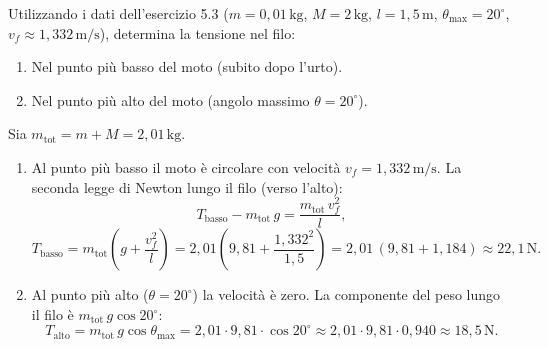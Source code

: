 \begin{question}[ID=5.4, subtitle={Tensione nel filo del pendolo balistico}, tags={pendolo balistico, tensione del filo}, difficulty=difficile]
Utilizzando i dati dell'esercizio 5.3 (\(m = 0{,}01 \, \text{kg}\), \(M = 2 \, \text{kg}\), \(l = 1{,}5 \, \text{m}\), \(\theta_{\max} = 20^\circ\), \(v_f \approx 1{,}332 \, \text{m/s}\)), determina la tensione nel filo:
\begin{enumerate}
    \item Nel punto più basso del moto (subito dopo l'urto).
    \item Nel punto più alto del moto (angolo massimo \(\theta = 20^\circ\)).
\end{enumerate}
\begin{solution}
    Sia \(m_{\text{tot}} = m + M = 2{,}01 \, \text{kg}\).
    \begin{enumerate}
        \item Al punto più basso il moto è circolare con velocità \(v_f = 1{,}332 \, \text{m/s}\).
        La seconda legge di Newton lungo il filo (verso l'alto):
        \[
            T_{\text{basso}} - m_{\text{tot}}\,g = \frac{m_{\text{tot}}\,v_f^2}{l},
        \]
        \[
            T_{\text{basso}} = m_{\text{tot}}\!\left(g + \frac{v_f^2}{l}\right)
            = 2{,}01\!\left(9{,}81 + \frac{1{,}332^2}{1{,}5}\right)
            = 2{,}01\,(9{,}81 + 1{,}184) \approx 22{,}1 \, \text{N}.
        \]
        \item Al punto più alto (\(\theta = 20^\circ\)) la velocità è zero.
        La componente del peso lungo il filo è \(m_{\text{tot}}\,g\cos20^\circ\):
        \[
            T_{\text{alto}} = m_{\text{tot}}\,g\cos\theta_{\max} = 2{,}01 \cdot 9{,}81 \cdot \cos20^\circ
            \approx 2{,}01 \cdot 9{,}81 \cdot 0{,}940 \approx 18{,}5 \, \text{N}.
        \]
    \end{enumerate}
\end{solution}
\end{question}


